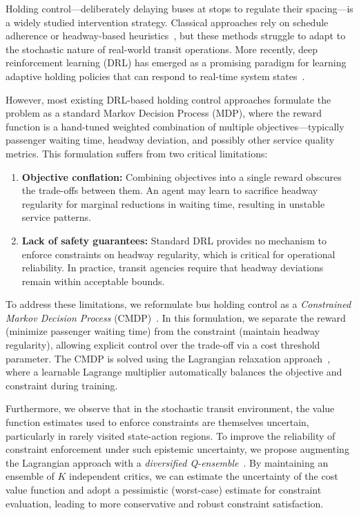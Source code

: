 \documentclass[10pt]{article}
\begin{document}
Holding control---deliberately delaying buses at stops to regulate their spacing---is a widely studied intervention strategy. Classical approaches rely on schedule adherence or headway-based heuristics~\cite{Eberlein2001Holding, Daganzo2009Headway}, but these methods struggle to adapt to the stochastic nature of real-world transit operations. More recently, deep reinforcement learning (DRL) has emerged as a promising paradigm for learning adaptive holding policies that can respond to real-time system states~\cite{Wang2020DynamicHolding, Zhang2025SingleAgentBus}.

However, most existing DRL-based holding control approaches formulate the problem as a standard Markov Decision Process (MDP), where the reward function is a hand-tuned weighted combination of multiple objectives---typically passenger waiting time, headway deviation, and possibly other service quality metrics. This formulation suffers from two critical limitations:
\begin{enumerate}
    \item \textbf{Objective conflation:} Combining objectives into a single reward obscures the trade-offs between them. An agent may learn to sacrifice headway regularity for marginal reductions in waiting time, resulting in unstable service patterns.
    \item \textbf{Lack of safety guarantees:} Standard DRL provides no mechanism to enforce constraints on headway regularity, which is critical for operational reliability. In practice, transit agencies require that headway deviations remain within acceptable bounds.
\end{enumerate}

To address these limitations, we reformulate bus holding control as a \emph{Constrained Markov Decision Process} (CMDP)~\cite{Altman1999Constrained}. In this formulation, we separate the reward (minimize passenger waiting time) from the constraint (maintain headway regularity), allowing explicit control over the trade-off via a cost threshold parameter. The CMDP is solved using the Lagrangian relaxation approach~\cite{Stooke2020Responsive}, where a learnable Lagrange multiplier automatically balances the objective and constraint during training.

Furthermore, we observe that in the stochastic transit environment, the value function estimates used to enforce constraints are themselves uncertain, particularly in rarely visited state-action regions. To improve the reliability of constraint enforcement under such epistemic uncertainty, we propose augmenting the Lagrangian approach with a \emph{diversified Q-ensemble}~\cite{An2021UncertaintyEnsemble}. By maintaining an ensemble of $K$ independent critics, we can estimate the uncertainty of the cost value function and adopt a pessimistic (worst-case) estimate for constraint evaluation, leading to more conservative and robust constraint satisfaction.
\end{document}
